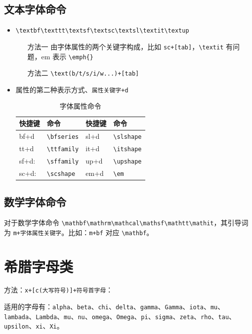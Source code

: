\documentclass[geye,green,pad,cn]{elegantnote}
\begin{document}
\subsection{文本字体命令}

\begin{itemize}
\item \lstinline|\textbf\texttt\textsf\textsc\textsl\textit\textup|
\begin{itemize}
\item[方法一] 由字体属性的两个关键字构成，比如 \lstinline{sc+[tab]}，\lstinline{\textit} 有问题，em 表示 \lstinline|\emph{}|
\item[方法二] \lstinline{\text(b/t/s/i/w...)+[tab]}
\end{itemize}
\item 属性的第二种表示方式、\lstinline{属性关键字+d}
\begin{table}[htbp]
  \centering
  \caption{字体属性命令}
    \begin{tabular}{llll}
    \toprule
    快捷键   & 命令    & 快捷键 & 命令 \\
    \midrule
    bf+d   & \lstinline|\bfseries| & sl+d & \lstinline|\slshape| \\
    tt+d & \lstinline|\ttfamily| & it+d & \lstinline|\itshape| \\
    sf+d:  & \lstinline|\sffamily| & up+d & \lstinline|\upshape| \\
    sc+d:  & \lstinline|\scshape| & em+d & \lstinline|\em| \\
    \bottomrule
    \end{tabular}%
  \label{tab:greek}%
\end{table}%
\end{itemize}

\subsection{数学字体命令}

对于数学字体命令 \lstinline{\mathbf\mathrm\mathcal\mathsf\mathtt\mathit}，其引导词为 \lstinline{m+字体属性关键字}。比如：\lstinline{m+bf} 对应 \lstinline{\mathbf}。
    
\section{希腊字母类}
方法：\lstinline|x+[c(大写符号)]+符号首字母|：

适用的字母有：\lstinline|alpha|、\lstinline|beta|、\lstinline|chi|、\lstinline|delta|、\lstinline|gamma|、\lstinline|Gamma|、\lstinline|iota|、\lstinline|mu|、\lstinline|lambada|、\lstinline|Lambda|、\lstinline|mu|、\lstinline|nu|、\lstinline|omega|、\lstinline|Omega|、\lstinline|pi|、\lstinline|sigma|、\lstinline|zeta|、\lstinline|rho|、\lstinline|tau|、\lstinline|upsilon|、\lstinline|xi|、\lstinline|Xi|。
\end{document}

